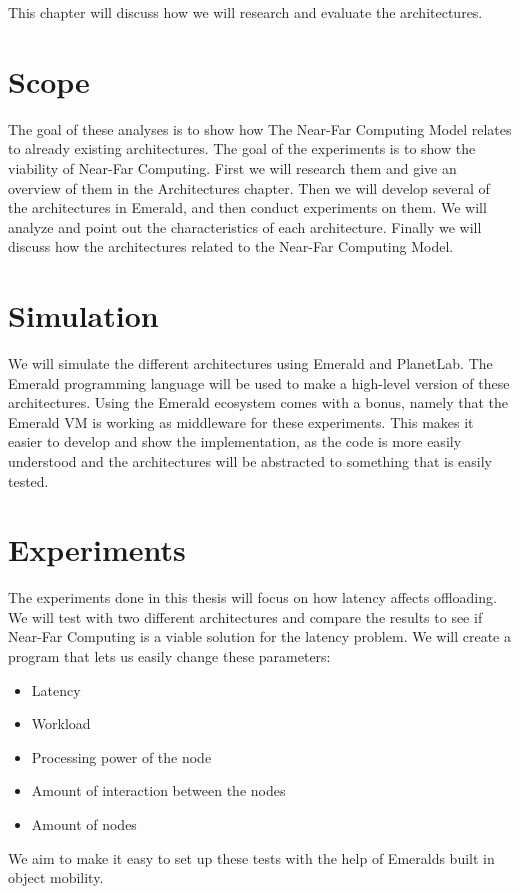This chapter will discuss how we will research and evaluate the architectures.


\section{Scope}
The goal of these analyses is to show how The Near-Far Computing Model relates to already existing architectures. The goal of the experiments is to show the viability of Near-Far Computing. First we will research them and give an overview of them in the Architectures chapter. Then we will develop several of the architectures in Emerald, and then conduct experiments on them. We will analyze and point out the characteristics of each architecture. Finally we will discuss how the architectures related to the Near-Far Computing Model.




\section{Simulation}
We will simulate the different architectures using Emerald and PlanetLab. The Emerald programming language will be used to make a high-level version of these architectures. Using the Emerald ecosystem comes with a bonus, namely that the Emerald VM is working as middleware for these experiments. This makes it easier to develop and show the implementation, as the code is more easily understood and the architectures will be abstracted to something that is easily tested.








\section{Experiments}
The experiments done in this thesis will focus on how latency affects offloading. We will test with two different architectures and compare the results to see if Near-Far Computing is a viable solution for the latency problem. We will create a program that lets us easily change these parameters:
\begin{itemize}
    \item Latency
    \item Workload
    \item Processing power of the node
    \item Amount of interaction between the nodes
    \item Amount of nodes
\end{itemize}
We aim to make it easy to set up these tests with the help of Emeralds built in object mobility. 

